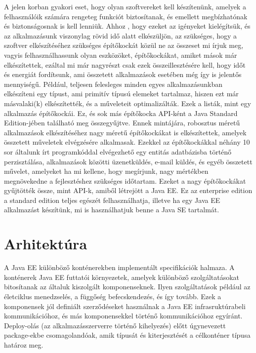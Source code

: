 \documentclass[centeredchapter]{thesis-ekf}
\theoremstyle{definition}
\theoremstyle{remark}
\begin{document}
A jelen korban gyakori eset, hogy olyan szoftvereket kell készítenünk, amelyek a felhasználóik számára rengeteg funkciót biztosítanak, és emellett megbízhatónak és biztonságosnak is kell lenniük. Ahhoz , hogy ezeket az igényeket kielégítsük, és az alkalmazásunk viszonylag rövid idő alatt elkészüljön, az szükséges, hogy a szoftver elkészítéséhez szükséges építőkockát közül ne az összeset mi írjuk meg, vagyis felhasználhassunk olyan eszközöket, építőkockákat, amiket mások már elkészítettek, ezáltal mi már nagyrészt csak ezek összeillesztésére kell, hogy időt és energiát fordítsunk, ami összetett alkalmazások esetében még így is jelentős mennyiségű. 
Például, teljesen felesleges minden egyes alkalmazásunkban elkészíteni egy típust, ami primitív típusú elemeket tartalmaz, hiszen ezt már másvalaki(k) elkészítették, és a műveleteit optimalizálták. Ezek a listák, mint egy alkalmazás építőkockái. Ez, és sok más építőkocka API-ként a Java Standard Edition-jében található meg összegyűjtve.
Ennek mintájára, robosztus méretű alkalmazások elkészítéséhez nagy méretű építőkockákat is elkészítettek, amelyek összetett műveletek elvégzésére alkalmasak. Ezekkel az építőkockákkal néhány 10 sor általunk írt programkóddal elvégezhető egy entitás adatbázisba történő perzisztálása, alkalmazások közötti üzenetküldés, e-mail küldés, és egyéb összetett művelet, amelyeket ha mi kellene, hogy megírjunk, nagy mértékben megnövekedne a fejlesztéshez szükséges időtartam.
Ezeket a nagy építőkockákat gyűjtötték össze, mint API-k, amiből létrejött a Java EE.
Ez az enterprise edition a standard edition teljes egészét felhasználhatja, illetve ha egy Java EE alkalmazást készítünk, mi is használhatjuk benne a Java SE tartalmát.

\section{Arhitektúra}

A Java EE különböző konténerekben implementált specifikációk halmaza. A konténerek Java EE futtatói környezetek, amelyek különböző szolgáltatásokat bitosítanak az általuk kiszolgált komponenseknek. Ilyen szolgáltatások például az életciklus menedzselés, a függőség befecskendezés, és így tovább. Ezek a komponensek jól definiált szerződéseket használnak a Java EE infrasruktúrabeli kommunikációhoz, és más komponensekkel történő kommunikációhoz egyíránt. Deploy-olás (az alkalmazásszerverre történő kihelyezés) előtt úgynevezett package-ekbe csomagolandóak, amik típusát és kiterjesztését a célkonténer típusa határoz meg.
\end{document}
